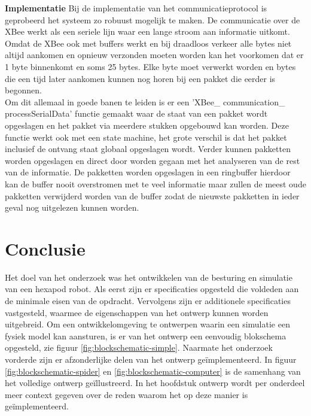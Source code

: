 \documentclass[10pt,a4paper]{article}
\begin{document}
\textbf{Implementatie}
Bij de implementatie van het communicatieprotocol is geprobeerd het systeem zo robuust mogelijk te maken. De communicatie over de XBee werkt als een seriele lijn waar een lange stroom aan informatie uitkomt. Omdat de XBee ook met buffers werkt en bij draadloos verkeer alle bytes niet altijd aankomen en opnieuw verzonden moeten worden kan het voorkomen dat er 1 byte binnenkomt en soms 25 bytes. Elke byte moet verwerkt worden en bytes die een tijd later aankomen kunnen nog horen bij een pakket die eerder is begonnen.\\
Om dit allemaal in goede banen te leiden is er een  'XBee\_ communication\_ processSerialData' functie gemaakt waar de staat van een pakket wordt opgeslagen en het pakket via meerdere stukken opgebouwd kan worden. Deze functie werkt ook met een state machine, het grote verschil is dat het pakket inclusief de ontvang staat globaal opgeslagen wordt. Verder kunnen pakketten worden opgeslagen en direct door worden gegaan met het analyseren van de rest van de informatie. De pakketten worden opgeslagen in een ringbuffer hierdoor kan de buffer nooit overstromen met te veel informatie maar zullen de meest oude pakketten verwijderd worden van de buffer zodat de nieuwste pakketten in ieder geval nog uitgelezen kunnen worden.\\

\newpage

\section{Conclusie}
Het doel van het onderzoek was het ontwikkelen van de besturing en simulatie van een hexapod robot. Als eerst zijn er specificaties opgesteld die voldeden aan de minimale eisen van de opdracht. Vervolgens zijn er additionele specificaties vastgesteld, waarmee de eigenschappen van het ontwerp kunnen worden uitgebreid. Om een ontwikkelomgeving te ontwerpen waarin een simulatie een fysiek model kan aansturen, is er van het ontwerp een eenvoudig blokschema opgesteld, zie figuur \ref{fig:blockschematic-simple}. Naarmate het onderzoek vorderde zijn er afzonderlijke delen van het ontwerp ge\"implementeerd. In figuur \ref{fig:blockschematic-spider} en \ref{fig:blockschematic-computer} is de samenhang van het volledige ontwerp ge\"illustreerd. In het hoofdstuk ontwerp wordt per onderdeel meer context gegeven over de reden waarom het op deze manier is ge\"implementeerd.
\end{document}
